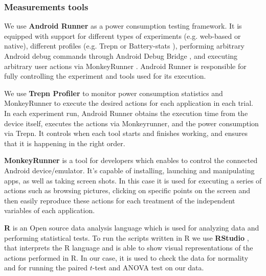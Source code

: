 \subsubsection*{Measurements tools}

We use \textbf{Android Runner} \cite{androidrunner} as a power consumption testing framework. It is equipped with support for different types of experiments (e.g. web-based or native), different profiles (e.g. Trepn \cite{trepn} or Battery-stats \cite{batterystats}), performing arbitrary Android debug commands through Android Debug Bridge \cite{adb}, and executing arbitrary user actions via MonkeyRunner \cite{monkeyrunner}. Android Runner is responsible for fully controlling the experiment and tools used for its execution. 

We use \textbf{Trepn Profiler} \cite{trepn} to monitor power consumption statistics and MonkeyRunner to execute the desired actions for each application in each trial. In each experiment run, Android Runner obtains the execution time from the device itself, executes the actions via Monkeyrunner, and the power consumption via Trepn. It controls when each tool starts and finishes working, and ensures that it is happening in the right order.

\textbf{MonkeyRunner} \cite{monkeyrunner} is a tool for developers which enables to control the connected Android device/emulator. It's capable of installing, launching and manipulating apps, as well as taking screen shots. In this case it is used for executing a series of actions such as browsing pictures, clicking on specific points on the screen and then easily reproduce these actions for each treatment of the independent variables of each application. 

\textbf{R} \cite{team2013r} is an Open source data analysis language which is used for analyzing data and performing statistical tests. To run the scripts written in R we use \textbf{RStudio} \cite{team2015rstudio}, that interprets the R language and is able to show visual representations of the actions performed in R. In our case, it is used to check the data for normality and for running the paired $t$-test and ANOVA test  on our data. 




